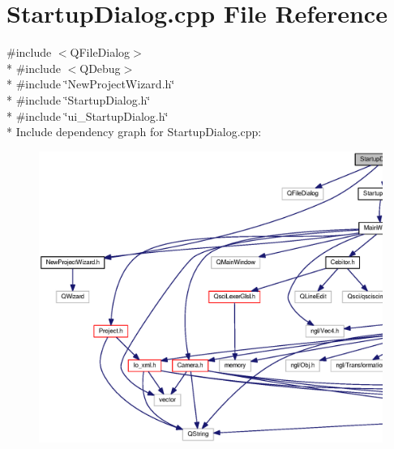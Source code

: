 \section{Startup\-Dialog.\-cpp File Reference}
\label{_startup_dialog_8cpp}
{\ttfamily \#include $<$Q\-File\-Dialog$>$}\\*
{\ttfamily \#include $<$Q\-Debug$>$}\\*
{\ttfamily \#include \char`\"{}New\-Project\-Wizard.\-h\char`\"{}}\\*
{\ttfamily \#include \char`\"{}Startup\-Dialog.\-h\char`\"{}}\\*
{\ttfamily \#include \char`\"{}ui\-\_\-\-Startup\-Dialog.\-h\char`\"{}}\\*
Include dependency graph for Startup\-Dialog.\-cpp\-:
\nopagebreak
\begin{figure}[H]
\begin{center}
\leavevmode
\includegraphics[width=350pt]{_startup_dialog_8cpp__incl}
\end{center}
\end{figure}
